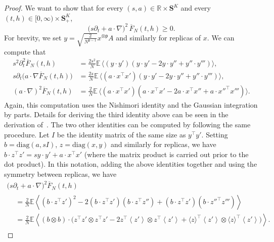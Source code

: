\documentclass[AHL,Unicode,longabstracts,published]{cedram}
\newcommand{\R}{\mathbb{R}}
\newcommand{\E}{\mathbb{E}}
\renewcommand{\S}{\mathbf{S}}
\newcommand{\sfp}{\mathsf{p}}
\newcommand{\diagl}{\mathrm{diag}}
\renewcommand{\geq}{\geqslant}
\renewcommand{\bar}{\overline}
\newcommand{\la}{\left\langle}
\newcommand{\ra}{\right\rangle}
\begin{document}
\begin{proof}
We want to show that for every $(s,a)\in \R\times \S^K$ and every $(t,h)\in [0,\infty)\times \S^K_+$,
\begin{equation*}
\big(s\partial_t + a\cdot\nabla\big)^2\,\bar F_N(t,h)\geq 0.
\end{equation*}
For brevity, we set $y =\sqrt{\frac{2}{N^{\sfp-1}}} x^{\otimes \sfp}A$ and similarly for replicas of $x$. We can compute that
\begin{align*}
s^2 \partial_t^2 \bar F_N(t,h) &= \frac{2s^2}{N} \E \,\big\langle \left(y \cdot y'\right)\left(y\cdot y ' - 2 y\cdot y'' + y''\cdot y'''\right)\big\rangle,\\
s \partial_t \big(a\cdot\nabla\bar F_N(t,h)\big) &= \frac{2s}{N} \E \,\big\langle \left(a\cdot x^\intercal x'\right)\left(y\cdot y ' - 2 y\cdot y'' + y''\cdot y'''\right)\big\rangle,\\
(a\cdot\nabla)^2\bar F_N(t,h) &= \frac{2}{N} \E\,\big\langle \left(a\cdot x^\intercal x'\right)\left(a\cdot x^\intercal x' - 2a\cdot x^\intercal x'' +a\cdot x''^\intercal x'''\right)\big\rangle.
\end{align*}
Again, this computation uses the Nishimori identity and the Gaussian integration {by} parts. Details for deriving the third identity above can be seen in the derivation of~\cite[(3.27)]{mourrat2019hamilton}. The two other identities can be computed by following the same procedure. Let $I$ be the identity matrix of the same size as $y^\intercal y'$. Setting $b = \diagl(a,sI)$, $z=\diagl(x,y)$ and similarly for replicas, we have $b\cdot z^\intercal z' = sy\cdot y'+a\cdot x^\intercal x'$ (where the matrix product is carried out prior to the dot product). In this notation, adding the above identities together and using the symmetry between replicas, we have
\begin{multline*}
\big(s\partial_t + a\cdot\nabla\big)^2\bar F_N(t,h)\\
\begin{aligned}
&= \frac{2}{N}\E \la \left(b\cdot z^\intercal z'\right)^2 -2\left(b\cdot z^\intercal z'\right)\left(b\cdot z^\intercal z''\right) +\left(b\cdot z^\intercal z'\right)\left(b\cdot z''^\intercal z'''\right)\ra\\
&= \frac{2}{N}\E\la \left(b\otimes b\right)\cdot\big(z^\intercal z'\otimes z^\intercal z' - 2z^\intercal \left\langle z'\right\rangle \otimes z^\intercal \left\langle z'\right\rangle + \langle z\rangle^\intercal \left\langle z'\right\rangle \otimes \langle z\rangle^\intercal \left\langle z'\right\rangle\big) \ra.

\end{aligned}
\end{multline*}
\end{proof}
\end{document}
